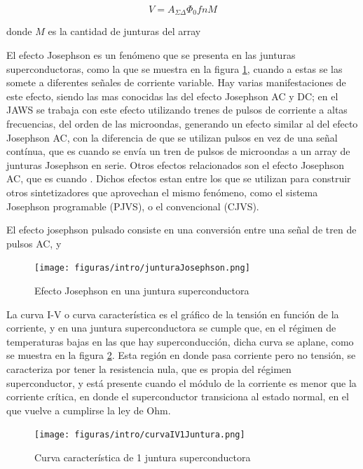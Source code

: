 \documentclass[twoside]{article}
\begin{document}
\begin{multicols}{2}
\begin{equation}
    V = A_{\Sigma\Delta} \Phi_0 f n M
    \label{eq:intro_ecuacionJosephson}
\end{equation}

donde $M$ es la cantidad de junturas del array

El efecto Josephson es un fenómeno que se presenta en las junturas superconductoras, como la que se muestra en la figura \ref{fig:intro_junturaJosephson}, cuando a estas se las somete a diferentes señales de corriente variable. Hay varias manifestaciones de este efecto, siendo las mas conocidas las del efecto Josephson AC y DC; en el JAWS se trabaja con este efecto utilizando trenes de pulsos de corriente a altas frecuencias, del orden de las microondas, generando un efecto similar al del efecto Josephson AC, con la diferencia de que se utilizan pulsos en vez de una señal contínua, que es cuando se envía un tren de pulsos de microondas a un array de junturas Josephson en serie. Otros efectos relacionados son el efecto Josephson AC, que es cuando . Dichos efectos estan entre los que se utilizan para construir otros sintetizadores que aprovechan el mismo fenómeno, como el sistema Josephson programable (PJVS), o el convencional (CJVS). 

El efecto josephson pulsado consiste en una conversión entre una señal de tren de pulsos AC,  y 



\begin{figure}[H]
    \centering
    \texttt{[image: figuras/intro/junturaJosephson.png]}
    \caption{Efecto Josephson en una juntura superconductora}
    \label{fig:intro_junturaJosephson}
\end{figure}

La curva I-V o curva característica es el gráfico de la tensión en función de la corriente, y en una juntura superconductora se cumple que, en el régimen de temperaturas bajas en las que hay superconducción, dicha curva se aplane, como se muestra en la figura \ref{fig:intro_curvaIV1Juntura}. Esta región en donde pasa corriente  pero no tensión, se caracteriza por tener la resistencia nula, que es propia del régimen superconductor, y está presente cuando el módulo de la corriente es menor que la corriente crítica, en donde el superconductor transiciona al estado normal, en el que vuelve a cumplirse la ley de Ohm. 

\begin{figure}[H]
    \centering
    \texttt{[image: figuras/intro/curvaIV1Juntura.png]}
    \caption{Curva característica de 1 juntura superconductora}
    \label{fig:intro_curvaIV1Juntura}
\end{figure}


\end{multicols}
\end{document}
